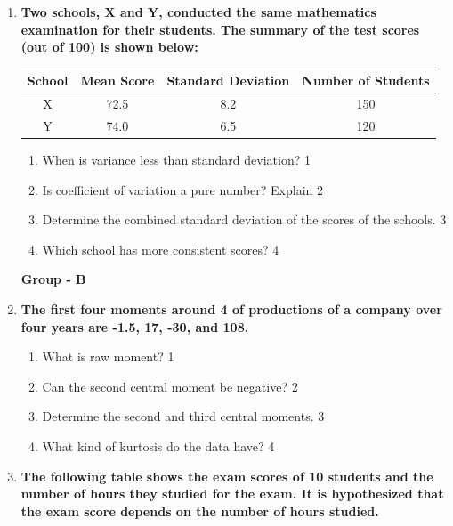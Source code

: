 \documentclass[12pt]{article}
\begin{document}
\begin{enumerate}
   \item 
  \textbf{Two schools, X and Y, conducted the same mathematics examination for their students. The summary of the test scores (out of 100) is shown below:}

\begin{table}[h]
\centering
\begin{tabular}{c|ccc}
School & Mean Score & Standard Deviation & Number of Students \\ \hline
X      & 72.5       & 8.2                & 150                \\ 
Y      & 74.0       & 6.5                & 120               
\end{tabular}
\end{table}

  \begin{enumerate}
      \item When is variance less than standard deviation? \hfill 1
      \item Is coefficient of variation a pure number? Explain \hfill 2
    \item  
	Determine the combined standard deviation of the scores of the schools. \hfill 3
    \item
	Which school has more consistent scores? \hfill 4
  \end{enumerate}

  \begin{center}
\textbf{Group  - B}
\end{center}


  
   \item
	  \textbf{The first four moments around 4 of productions of a company over four years are -1.5, 17, -30, and 108.} 
  
  \begin{enumerate}
  \item  What is raw moment? \hfill 1
    \item
	Can the second central moment be negative? \hfill 2
    \item  
	Determine the second and third central moments. \hfill 3
    \item
	What kind of kurtosis do the data have? \hfill 4
  \end{enumerate}

   \item
	  \textbf{The following table shows the exam scores of 10 students and the number of hours they studied for the exam. It is hypothesized that the exam score depends on the number of hours studied.} 
	  

\end{enumerate}
\end{document}
